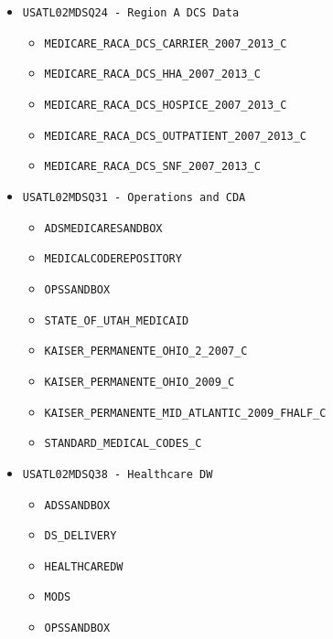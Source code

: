 \documentclass{article}
\begin{document}
\begin{multicols}{3}
{\begin{itemize}
\begin{itemize}
		\item  \texttt{MEDICARE\_RACB\_CGI\_HOSPICE\_2007\_2013\_C}
		\item  \texttt{MEDICARE\_RACB\_CGI\_OUTPATIENT\_2007\_2013\_C}
		\item  \texttt{MEDICARE\_RACB\_CGI\_SNF\_2007\_2013\_C}
	\end{itemize}  
\item  \texttt{USATL02MDSQ24 - Region A DCS Data}
\begin{itemize}
		\item  \texttt{MEDICARE\_RACA\_DCS\_CARRIER\_2007\_2013\_C}
		\item  \texttt{MEDICARE\_RACA\_DCS\_HHA\_2007\_2013\_C}
		\item  \texttt{MEDICARE\_RACA\_DCS\_HOSPICE\_2007\_2013\_C}
		\item  \texttt{MEDICARE\_RACA\_DCS\_OUTPATIENT\_2007\_2013\_C}
		\item  \texttt{MEDICARE\_RACA\_DCS\_SNF\_2007\_2013\_C}
	\end{itemize}  
\item  \texttt{USATL02MDSQ31 - Operations and CDA}
\begin{itemize}
	\item  \texttt{ADSMEDICARESANDBOX}
	\item  \texttt{MEDICALCODEREPOSITORY}
	\item  \texttt{OPSSANDBOX}
	\item  \texttt{STATE\_OF\_UTAH\_MEDICAID}
	\item  \texttt{KAISER\_PERMANENTE\_OHIO\_2\_2007\_C}
	\item  \texttt{KAISER\_PERMANENTE\_OHIO\_2009\_C}
	\item  \texttt{KAISER\_PERMANENTE\_MID\_ATLANTIC\_2009\_FHALF\_C}
	\item  \texttt{STANDARD\_MEDICAL\_CODES\_C}
	\end{itemize}
\item  \texttt{USATL02MDSQ38 - Healthcare DW}
\begin{itemize}
		\item  \texttt{ADSSANDBOX}
		\item  \texttt{DS\_DELIVERY}
		\item  \texttt{HEALTHCAREDW}
		\item \texttt{MODS}
		\item  \texttt{OPSSANDBOX}
	\end{itemize}  

\end{itemize}}


\end{multicols}
\end{document}
